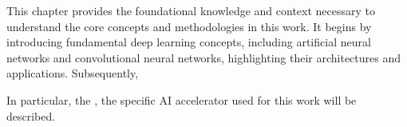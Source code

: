 This chapter provides the foundational knowledge and context necessary to understand the core concepts and methodologies in this work.
It begins by introducing fundamental deep learning concepts, including artificial neural networks and convolutional neural networks, highlighting their architectures and applications.  
Subsequently, 

In particular, the \graicore{}, the specific AI accelerator used for this work will be described.
